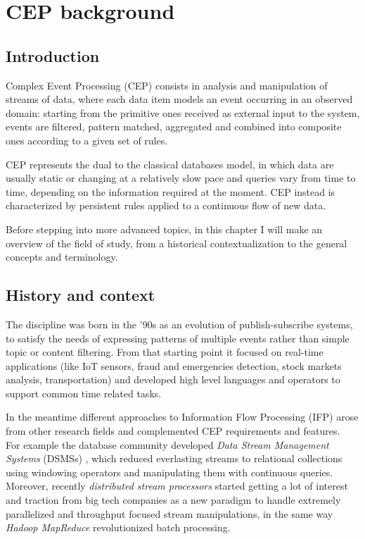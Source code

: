 \chapter{CEP background}

\section{Introduction}
Complex Event Processing (CEP) \cite{cep-book} consists in analysis and manipulation of streams of data, where each data item models an event occurring in an observed domain: starting from the primitive ones received as external input to the system, events are filtered, pattern matched, aggregated and combined into composite ones according to a given set of rules.

CEP represents the dual to the classical databases model, in which data are usually static or changing at a relatively slow pace and queries vary from time to time, depending on the information required at the moment. CEP instead is characterized by persistent rules applied to a continuous flow of new data.

Before stepping into more advanced topics, in this chapter I will make an overview of the field of study, from a historical contextualization to the general concepts and terminology.

\section{History and context}
The discipline was born in the '90s as an evolution of publish-subscribe systems, to satisfy the needs of expressing patterns of multiple events rather than simple topic or content filtering. From that starting point it focused on real-time applications (like IoT sensors, fraud and emergencies detection, stock markets analysis, transportation) and developed high level languages and operators to support common time related tasks.


In the meantime different approaches to Information Flow Processing (IFP) \cite{ifp-survey} arose from other research fields and complemented CEP requirements and features.\\
For example the database community developed \emph{Data Stream Management Systems} (DSMSs) \cite{dsms}, which reduced everlasting streams to relational collections using windowing operators and manipulating them with continuous queries.\\
Moreover, recently \emph{distributed stream processors} started getting a lot of interest and traction from big tech companies as a new paradigm to handle extremely parallelized and throughput focused stream manipulations, in the same way \emph{Hadoop MapReduce} \cite{map-reduce} revolutionized batch processing.

